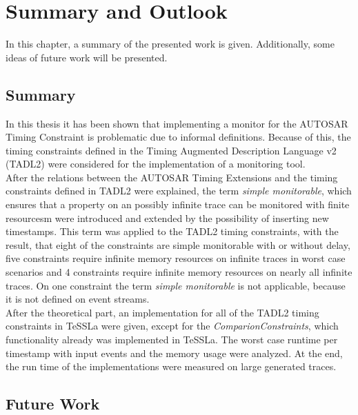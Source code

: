 
\chapter{Summary and Outlook}
\label{chapter-fazit}

In this chapter, a summary of the presented work is given. Additionally, some ideas of future work will be presented.
\section{Summary}
	In this thesis it has been shown that implementing a monitor for the AUTOSAR Timing Constraint is problematic due to informal definitions. Because of this, the timing constraints defined in the Timing Augmented Description Language v2 (TADL2) were considered for the implementation of a monitoring tool.\\
	After the relations between the AUTOSAR Timing Extensions and the timing constraints defined in TADL2 were explained, the term \textit{simple monitorable}, which ensures that a property on an possibly infinite trace can be monitored with finite resourcesm were introduced and extended by the possibility of inserting new timestamps. This term was applied to the TADL2 timing constraints, with the result, that eight of the constraints are simple monitorable with or without delay, five constraints require infinite memory resources on infinite traces in worst case scenarios and 4 constraints require infinite memory resources on nearly all infinite traces. On one constraint the term \textit{simple monitorable} is not applicable, because it is not defined on event streams.\\
	After the theoretical part, an implementation for all of the TADL2 timing constraints in TeSSLa were given, except for the \textit{ComparionConstraints}, which functionality already was implemented in TeSSLa. The worst case runtime per timestamp with input events and the memory usage were analyzed. At the end, the run time of the implementations were measured on large generated traces.
\section{Future Work}






